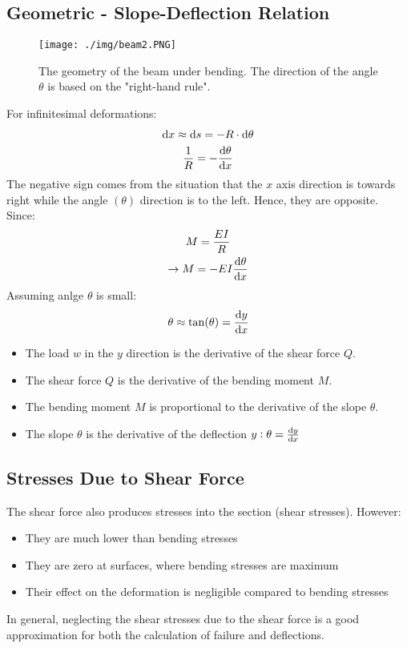 \subsection{Geometric - Slope-Deflection Relation}
\begin{figure}[H]
  \centering
  \texttt{[image: ./img/beam2.PNG]}
  \caption{The geometry of the beam under bending. The direction of the angle $\theta$ is based on the "right-hand rule".}
\end{figure}
For infinitesimal deformations:
\begin{gather}
  \dif x \approx \dif s = -R\cdot \dif \theta \\
  \frac{1}{R} = -\frac{\dif \theta}{\dif x}
\end{gather}
The negative sign comes from the situation that the $x$ axis direction is towards right while the angle $(\theta)$ direction is to the left. Hence, they are opposite. Since:
\begin{gather}
  M = \frac{EI}{R} \\
  \rightarrow M = -EI\frac{\dif \theta}{\dif x}
\end{gather}
Assuming anlge $\theta$ is small:
\begin{gather}
  \theta \approx \tan(\theta) = \frac{\dif y}{\dif x}
\end{gather}
\begin{itemize} [noitemsep]
  \item The load $w$ in the $y$ direction is the derivative of the shear force $Q$.
  \item The shear force $Q$ is the derivative of the bending moment $M$.
  \item The bending moment $M$ is proportional to the derivative of the slope $\theta$.
  \item The slope $\theta$ is the derivative of the deflection $y:\theta = \frac{\dif y}{\dif x}$
\end{itemize}
\subsection{Stresses Due to Shear Force}
The shear force also produces stresses into the section (shear stresses). However:
\begin{itemize}[noitemsep]
  \item They are much lower than bending stresses
  \item They are zero at surfaces, where bending stresses are maximum
  \item Their effect on the deformation is negligible compared to bending stresses
\end{itemize}
In general, neglecting the shear stresses due to the shear force is a good approximation for both the calculation of failure and deflections.
